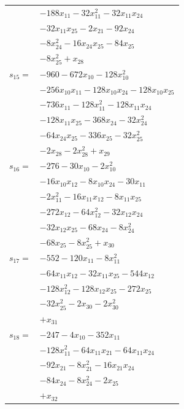 \begin{longtable}{@{}r@{\;}l@{}}
 & \(\displaystyle -188x_{11} -32x_{11}^{2} -32x_{11}x_{24}\) \\
 & \(\displaystyle -32x_{11}x_{25} -2x_{21} -92x_{24}\) \\
 & \(\displaystyle -8x_{24}^{2} -16x_{24}x_{25} -84x_{25}\) \\
 & \(\displaystyle -8x_{25}^{2} +x_{28}\) \\[3pt]
\(s_{15}=\) & \(\displaystyle -960 -672x_{10} -128x_{10}^{2}\) \\
 & \(\displaystyle -256x_{10}x_{11} -128x_{10}x_{24} -128x_{10}x_{25}\) \\
 & \(\displaystyle -736x_{11} -128x_{11}^{2} -128x_{11}x_{24}\) \\
 & \(\displaystyle -128x_{11}x_{25} -368x_{24} -32x_{24}^{2}\) \\
 & \(\displaystyle -64x_{24}x_{25} -336x_{25} -32x_{25}^{2}\) \\
 & \(\displaystyle -2x_{28} -2x_{28}^{2} +x_{29}\) \\[3pt]
\(s_{16}=\) & \(\displaystyle -276 -30x_{10} -2x_{10}^{2}\) \\
 & \(\displaystyle -16x_{10}x_{12} -8x_{10}x_{24} -30x_{11}\) \\
 & \(\displaystyle -2x_{11}^{2} -16x_{11}x_{12} -8x_{11}x_{25}\) \\
 & \(\displaystyle -272x_{12} -64x_{12}^{2} -32x_{12}x_{24}\) \\
 & \(\displaystyle -32x_{12}x_{25} -68x_{24} -8x_{24}^{2}\) \\
 & \(\displaystyle -68x_{25} -8x_{25}^{2} +x_{30}\) \\[3pt]
\(s_{17}=\) & \(\displaystyle -552 -120x_{11} -8x_{11}^{2}\) \\
 & \(\displaystyle -64x_{11}x_{12} -32x_{11}x_{25} -544x_{12}\) \\
 & \(\displaystyle -128x_{12}^{2} -128x_{12}x_{25} -272x_{25}\) \\
 & \(\displaystyle -32x_{25}^{2} -2x_{30} -2x_{30}^{2}\) \\
 & \(\displaystyle +x_{31}\) \\[3pt]
\(s_{18}=\) & \(\displaystyle -247 -4x_{10} -352x_{11}\) \\
 & \(\displaystyle -128x_{11}^{2} -64x_{11}x_{21} -64x_{11}x_{24}\) \\
 & \(\displaystyle -92x_{21} -8x_{21}^{2} -16x_{21}x_{24}\) \\
 & \(\displaystyle -84x_{24} -8x_{24}^{2} -2x_{25}\) \\
 & \(\displaystyle +x_{32}\) \\[3pt]

\end{longtable}
